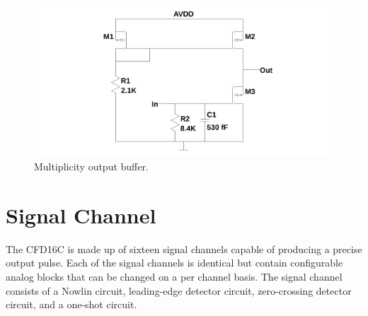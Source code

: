 \documentclass[12pt,oneside,final]{siuethesis}
\theoremstyle{definition}
\begin{document}
\begin{figure}[htbp!]
\centering
\includegraphics[scale=.3,keepaspectratio=true]{../LTspice_Drawings/multiplicity/mult_buffer.png} 
\caption{Multiplicity output buffer.}
\label{fig:mult}
\end{figure}


\section{Signal Channel}
\par The CFD16C is made up of sixteen signal channels capable of producing a precise output pulse. Each of the signal channels is identical but contain configurable analog blocks that can be changed on a per channel basis. The signal channel consists of a Nowlin circuit, leading-edge detector circuit, zero-crossing detector circuit, and a one-shot circuit. 
\end{document}
